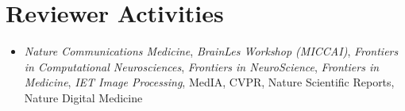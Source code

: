 \documentclass[letterpaper,11pt]{article}
\newcommand{\resumeItem}[1]{
  \item\small{
    {#1 \vspace{-2pt}}
  }
}
\newcommand{\resumeSubHeadingListStart}{\begin{itemize}[leftmargin=0.15in, label={}]}
\newcommand{\resumeSubHeadingListEnd}{\end{itemize}}
\begin{document}
\section{Reviewer Activities}
  \vspace{2pt}
  \resumeSubHeadingListStart
    \resumeItem{\textit{Nature Communications Medicine}, \textit{BrainLes Workshop (MICCAI)}, \textit{Frontiers in Computational Neurosciences}, \textit{Frontiers in NeuroScience}, \textit{Frontiers in Medicine}, \textit{IET Image Processing}, MedIA, CVPR, Nature Scientific Reports, Nature Digital Medicine}
  \resumeSubHeadingListEnd

\end{document}
